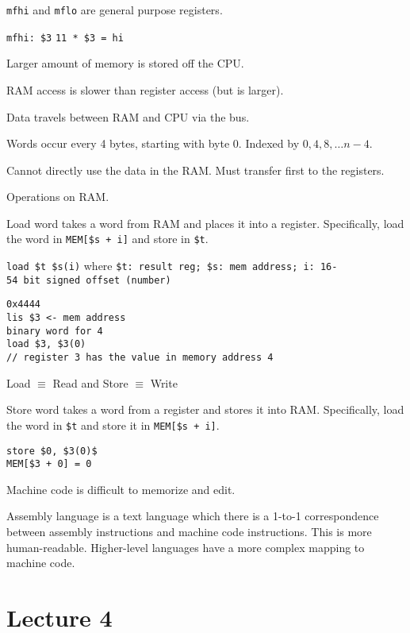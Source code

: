 \documentclass{article}
\begin{document}
\texttt{mfhi} and \texttt{mflo} are general purpose registers.

\texttt{mfhi:\ \$3} \texttt{11\ *\ \$3\ =\ hi}

Larger amount of memory is stored off the CPU.

RAM access is slower than register access (but is larger).

Data travels between RAM and CPU via the bus.

Words occur every 4 bytes, starting with byte 0. Indexed by
\(0, 4, 8, \ldots n-4\).

Cannot directly use the data in the RAM. Must transfer first to the
registers.

Operations on RAM.

Load word takes a word from RAM and places it into a register.
Specifically, load the word in \texttt{MEM{[}\$s\ +\ i{]}} and store in
\texttt{\$t}.

\texttt{load\ \$t\ \$s(i)} where
\texttt{\$t:\ result\ reg;\ \$s:\ mem\ address;\ i:\ 16-54\ bit\ signed\ offset\ (number)}

\begin{tcolorbox}
\begin{verbatim}
0x4444
lis $3 <- mem address
binary word for 4
load $3, $3(0)
// register 3 has the value in memory address 4
\end{verbatim}
\end{tcolorbox}

Load \(\equiv\) Read and Store \(\equiv\) Write

Store word takes a word from a register and stores it into RAM.
Specifically, load the word in \texttt{\$t} and store it in
\texttt{MEM{[}\$s\ +\ i{]}}.

\begin{tcolorbox}
\begin{verbatim}
store $0, $3(0)$
MEM[$3 + 0] = 0
\end{verbatim}
\end{tcolorbox}

Machine code is difficult to memorize and edit.

Assembly language is a text language which there is a 1-to-1
correspondence between assembly instructions and machine code
instructions. This is more human-readable. Higher-level languages have a
more complex mapping to machine code.

\section{Lecture 4}\label{lecture-4}
\end{document}
